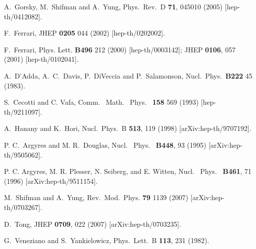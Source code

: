 \documentclass[epsfig,12pt]{article}
\newcommand{\ntwo}{${\mathcal N}=2\,$}
\begin{document}
{\begin{thebibliography}{99}
A.~Gorsky, M.~Shifman and A.~Yung,
Phys.\ Rev.\ D {\bf 71}, 045010 (2005)
[hep-th/0412082].

F.~Ferrari,
JHEP {\bf 0205} 044 (2002)
[hep-th/0202002].

F.~Ferrari,
 Phys. Lett. {\bf B496} 212 (2000)
[hep-th/0003142];
JHEP {\bf 0106}, 057 (2001)
[hep-th/0102041].

A.~D'Adda, A.~C.~Davis, P.~DiVeccia and P.~Salamonson,
Nucl.\ Phys.\ {\bf B222} 45 (1983).

S.~Cecotti and C. Vafa,
Comm. \ Math. \ Phys. \ {\bf 158} 569 (1993)
[hep-th/9211097].

A.~Hanany and K.~Hori,
  Nucl.\ Phys.\  B {\bf 513}, 119 (1998)
  [arXiv:hep-th/9707192].

P. C.~Argyres and M. R.~Douglas,
Nucl. \ Phys. \ {\bf B448}, 93 (1995)   
[arXiv:hep-th/9505062].
  
P. C. Argyres, M. R. Plesser, N. Seiberg, and E. Witten,
Nucl. \ Phys.  \ {\bf B461}, 71 (1996) 
[arXiv:hep-th/9511154].

M.~Shifman and A.~Yung,
Rev.\ Mod.\ Phys. {\bf 79} 1139 (2007)
[arXiv:hep-th/0703267].

  D.~Tong,
  JHEP {\bf 0709}, 022 (2007)
  [arXiv:hep-th/0703235].
  
 G.~Veneziano and S.~Yankielowicz,
  Phys.\ Lett.\  B {\bf 113}, 231 (1982).
  

\end{thebibliography}}
\end{document}
